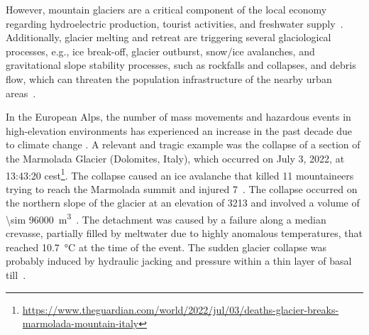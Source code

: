 However, mountain glaciers are a critical component of the local economy regarding hydroelectric production, tourist activities, and freshwater supply~\citep{Barnett2005, hock2005}. 
Additionally, glacier melting and retreat are triggering several glaciological processes, e.g., ice break-off, glacier outburst, snow/ice avalanches, and gravitational slope stability processes, such as rockfalls and collapses, and debris flow, which can threaten the population infrastructure of the nearby urban areas~\citep{Kaab2004, Deline2015, Giordan2020a}.

In the European Alps, the number of mass movements and hazardous events in high-elevation environments has experienced an increase in the past decade due to climate change \citep{chiarle2023, Nigrelli2024}.
A relevant and tragic example was the collapse of a section of the Marmolada Glacier (Dolomites, Italy), which occurred on July 3, 2022, at 13:43:20 \acs{cest}\footnote{\url{https://www.theguardian.com/world/2022/jul/03/deaths-glacier-breaks-marmolada-mountain-italy}}. 
The collapse caused an ice avalanche that killed 11 mountaineers trying to reach the Marmolada summit and injured 7~\citep{Olivieri2023, Bondesan2023}.
The collapse occurred on the northern slope of the glacier at an elevation of \SI{3213}{\masl} and involved a volume of \SI{\sim 96000}{\cubic\meter}~\citep{Olivieri2023}.
The detachment was caused by a failure along a median crevasse, partially filled by meltwater due to highly anomalous temperatures, that reached \SI{10.7}{\celsius} at the time of the event.
The sudden glacier collapse was probably induced by hydraulic jacking and pressure within a thin layer of basal till~\citep{Bondesan2023}.


